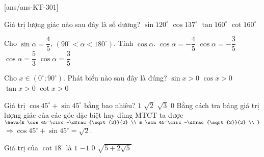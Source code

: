 
\setcounter{ex}{0}\setcounter{ex}{0}
[ans/ans-KT-301]

\begin{ex} 
	Giá trị lượng giác nào sau đây là số dương?
	\choice
	{\True $\sin 120^\circ$}
	{$\cos 137^\circ$}
	{$\tan 160^\circ$}
	{$\cot 160^\circ$}
\end{ex}

\begin{ex}
	Cho $\sin\alpha=\dfrac{4}{5}$, $\left(90^\circ<\alpha <180^\circ\right)$. Tính $\cos\alpha $.
	\choice
	{$\cos\alpha=-\dfrac{4}{5}$}
	{\True $\cos\alpha=-\dfrac{3}{5}$}
	{$\cos\alpha=\dfrac{5}{3}$}
	{$\cos\alpha=\dfrac{3}{5}$}
\end{ex}
\begin{ex}
	Cho $x\in\left(0^\circ;90^\circ\right)$. Phát biểu nào sau đây là đúng?
	\choice
	{\True $\sin x>0$}
	{$\cos x>0$}
	{$\tan x>0$}
	{$\cot x>0$}
\end{ex}
\begin{ex}
	Giá trị $\cos 45^\circ+\sin 45^\circ$ bằng bao nhiêu?
	\choice
	{$1$}
	{\True $\sqrt{2}$}
	{$\sqrt{3}$}
	{$0$}
	\loigiai
	{Bằng cách tra bảng giá trị lượng giác của các góc đặc biệt hay dùng MTCT ta được $\heva{& \cos 45^\circ=\dfrac{\sqrt{2}}{2} \\ 
			& \sin 45^\circ=\dfrac{\sqrt{2}}{2} \\ 
		}$\\
		$\Rightarrow \cos 45^\circ+\sin 45^\circ=\sqrt{2}$.}
\end{ex}
\begin{ex}
	Giá trị của $\cot18^\circ$ là
	\choice
	{$1$}
	{$-1$}
	{$0$}
	{\True $\sqrt{5+2\sqrt{5}}$}
\end{ex}
